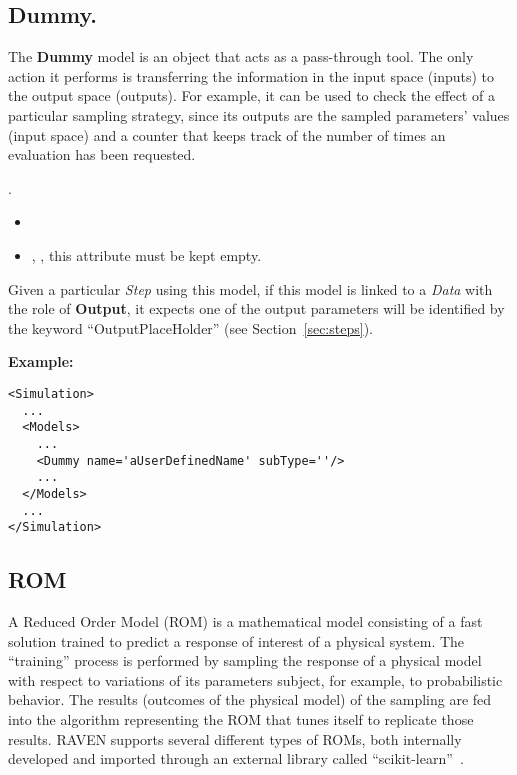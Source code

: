 \subsection{Dummy.}
\label{subsec:models_dummy}
The \textbf{Dummy} model is an object that acts as a pass-through tool.
%
The only action it performs is transferring the information in the input
space (inputs) to the output space (outputs).
%
For example, it can be used to check the effect of a particular sampling
strategy, since its outputs are the sampled parameters' values (input space) and
a counter that keeps track of the number of times an evaluation has been
requested.
%

.
%
\attrsIntro
%
\vspace{-5mm}
\begin{itemize}
  \itemsep0em
  \item \nameDescription
  \item {}, , this attribute
  must be kept empty.
\end{itemize}
\vspace{-5mm}
Given a particular \textit{Step} using this model, if this model is linked to
a \textit{Data} with the role of \textbf{Output}, it expects one of the output
parameters will be identified by the keyword ``OutputPlaceHolder'' (see 
Section~\ref{sec:steps}).

\textbf{Example:}
\begin{lstlisting}[style=XML,morekeywords={subType}]
<Simulation>
  ...
  <Models>
    ...
    <Dummy name='aUserDefinedName' subType=''/>
    ...
  </Models>
  ...
</Simulation>
\end{lstlisting}
\subsection{ROM}
\label{subsec:models_ROM}
A Reduced Order Model (ROM) is a mathematical model consisting of a fast
solution trained to predict a response of interest of a physical system.
%
The ``training'' process is performed by sampling the response of a physical
model with respect to variations of its parameters subject, for example, to
probabilistic behavior.
%
The results (outcomes of the physical model) of the sampling are fed into the
algorithm representing the ROM that tunes itself to replicate those results.
%
RAVEN supports several different types of ROMs, both internally developed and
imported through an external library called ``scikit-learn''~\cite{SciKitLearn}.

